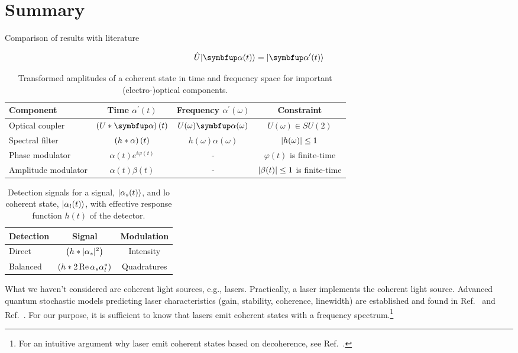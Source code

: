 \section*{Summary}

Comparison of results with literature

\begin{equation}
	\hat{U}
	\ket{\vb{\alpha}(t)}
	=
	\ket{\vb{\alpha}^\prime(t)}
\end{equation}

\begin{table}[htb]
	\centering	
	\begin{tabular}{lccc}
		\toprule
			Component & Time $\alpha^\prime(t)$ & Frequency $\alpha^\prime(\omega)$ & Constraint \\
		\midrule
			Optical coupler & $\left(U\conv\vb{\alpha}\right)(t)$ & $U(\omega)\vb{\alpha}(\omega)$ & $U(\omega)\in SU(2)$ \\
			Spectral filter & $\left(h\ast\alpha\right)(t)$ & $h(\omega)\alpha(\omega)$ & $\lvert h(\omega)\rvert\leq1$ \\
			Phase modulator & $\alpha(t)e^{i\varphi(t)}$ & - & $\varphi(t)$ is finite-time \\
			Amplitude modulator & $\alpha(t)\beta(t)$ & - & $\lvert\beta(t)\rvert\leq1$ is finite-time \\
		\bottomrule
	\end{tabular}
	\caption{Transformed amplitudes of a coherent state in time and frequency space for important (electro-)optical components.}
\end{table}

\begin{table}[htb]
	\centering	
	\begin{tabular}{lcc}
		\toprule
			Detection & Signal & Modulation \\
		\midrule
			Direct & $\left(h\ast\lvert\alpha_s\rvert^2\right)$ & Intensity \\
			Balanced & $\left(h\ast2\operatorname{Re}{\alpha_s\alpha_l^*}\right)$ & Quadratures \\
		\bottomrule
	\end{tabular}
	\caption{Detection signals for a signal, $\lvert\alpha_s(t)\rangle$, and \gls{lo} coherent state, $\lvert\alpha_l(t)\rangle$, with effective response function $h(t)$ of the detector.}
\end{table}

What we haven't considered are coherent light sources, e.g., lasers.
Practically, a laser implements the coherent light source.
Advanced quantum stochastic models predicting laser characteristics (gain, stability, coherence, linewidth) are established and found in  Ref.~\cite[p.~900]{Mandel1995} and Ref.~\cite{Haken2012}.
For our purpose, it is sufficient to know that lasers emit coherent states with a frequency spectrum.\footnote{For an intuitive argument why laser emit coherent states based on decoherence, see Ref.~\cite{Gea1998}.}